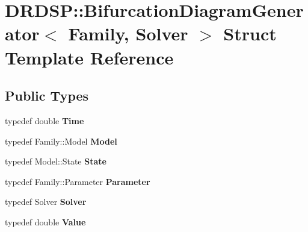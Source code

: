 \hypertarget{struct_d_r_d_s_p_1_1_bifurcation_diagram_generator}{\section{D\-R\-D\-S\-P\-:\-:Bifurcation\-Diagram\-Generator$<$ Family, Solver $>$ Struct Template Reference}
\label{struct_d_r_d_s_p_1_1_bifurcation_diagram_generator}
}
\subsection*{Public Types}
\begin{DoxyCompactItemize}
\item 
\hypertarget{struct_d_r_d_s_p_1_1_bifurcation_diagram_generator_a3715f872dee5b9c4159a759df5ec0261}{typedef double {\bfseries Time}}\label{struct_d_r_d_s_p_1_1_bifurcation_diagram_generator_a3715f872dee5b9c4159a759df5ec0261}

\item 
\hypertarget{struct_d_r_d_s_p_1_1_bifurcation_diagram_generator_ae526eabcef37f9c7f309f9c43c3c7031}{typedef Family\-::\-Model {\bfseries Model}}\label{struct_d_r_d_s_p_1_1_bifurcation_diagram_generator_ae526eabcef37f9c7f309f9c43c3c7031}

\item 
\hypertarget{struct_d_r_d_s_p_1_1_bifurcation_diagram_generator_afae92b1a1f9eceb9ee13b85d0bad8678}{typedef Model\-::\-State {\bfseries State}}\label{struct_d_r_d_s_p_1_1_bifurcation_diagram_generator_afae92b1a1f9eceb9ee13b85d0bad8678}

\item 
\hypertarget{struct_d_r_d_s_p_1_1_bifurcation_diagram_generator_a4c2f0e614b03aa98fa41b47f8ee9ed11}{typedef Family\-::\-Parameter {\bfseries Parameter}}\label{struct_d_r_d_s_p_1_1_bifurcation_diagram_generator_a4c2f0e614b03aa98fa41b47f8ee9ed11}

\item 
\hypertarget{struct_d_r_d_s_p_1_1_bifurcation_diagram_generator_aabd93ae7f59c8e9f8cc4e6808b53e4b5}{typedef Solver {\bfseries Solver}}\label{struct_d_r_d_s_p_1_1_bifurcation_diagram_generator_aabd93ae7f59c8e9f8cc4e6808b53e4b5}

\item 
\hypertarget{struct_d_r_d_s_p_1_1_bifurcation_diagram_generator_a7816641311596ca1fd7654a056fcb976}{typedef double {\bfseries Value}}\label{struct_d_r_d_s_p_1_1_bifurcation_diagram_generator_a7816641311596ca1fd7654a056fcb976}

\end{DoxyCompactItemize}
